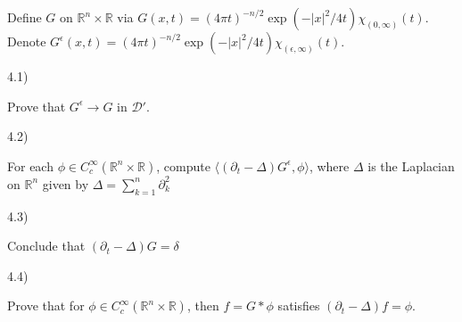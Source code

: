 \documentclass[10pt]{article}
\newenvironment{problem}[2][]{\begin{trivlist}
\item[\hskip \labelsep {\bfseries #1}\hskip \labelsep {\bfseries #2.}]}{\end{trivlist}}
\begin{document}
\begin{problem}{Question 4}

Define $G$ on $\mathbb{R}^n \times \mathbb{R}$ via $G(x,t) = (4\pi t)^{-n/2} \exp(-|x|^2/4t) \chi_{(0,\infty)}(t)$. Denote $G^\epsilon(x,t) = (4\pi t)^{-n/2} \exp(-|x|^2/4t) \chi_{(\epsilon,\infty)}(t)$.

4.1)

Prove that $G^\epsilon \to G$ in $\mathcal{D}'$.

4.2)

For each $\phi \in C^\infty_c(\mathbb{R}^n \times \mathbb{R})$, compute $\langle (\partial_t - \Delta) G^\epsilon, \phi \rangle$, where $\Delta$ is the Laplacian on $\mathbb{R}^n$ given by $\Delta = \sum_{k=1}^n \partial^2_k$

4.3)

Conclude that $(\partial_t - \Delta)G = \delta$

4.4)

Prove that for $\phi \in C^\infty_c(\mathbb{R}^n \times \mathbb{R})$, then $f = G \ast \phi$ satisfies $(\partial_t - \Delta)f = \phi$.

\end{problem}
\end{document}
